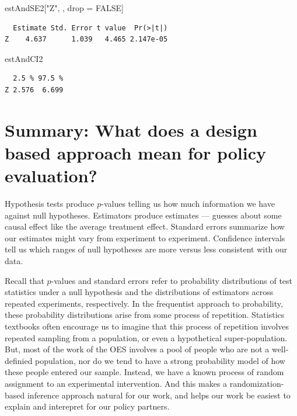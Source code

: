 \documentclass[
  12pt,
]{book}
\newenvironment{Shaded}{\begin{snugshade}}{\end{snugshade}}
\newcommand{\ConstantTok}[1]{\textcolor[rgb]{0.00,0.00,0.00}{#1}}
\newcommand{\NormalTok}[1]{#1}
\newcommand{\OtherTok}[1]{\textcolor[rgb]{0.56,0.35,0.01}{#1}}
\newcommand{\StringTok}[1]{\textcolor[rgb]{0.31,0.60,0.02}{#1}}
\theoremstyle{definition}
\theoremstyle{definition}
\theoremstyle{definition}
\theoremstyle{remark}
\begin{document}
\begin{Shaded}
\begin{Highlighting}[]
\NormalTok{estAndSE2[}\StringTok{"Z"}\NormalTok{, , drop }\OtherTok{=} \ConstantTok{FALSE}\NormalTok{]}
\end{Highlighting}
\end{Shaded}

\begin{verbatim}
  Estimate Std. Error t value  Pr(>|t|)
Z    4.637      1.039   4.465 2.147e-05
\end{verbatim}

\begin{Shaded}
\begin{Highlighting}[]
\NormalTok{estAndCI2}
\end{Highlighting}
\end{Shaded}

\begin{verbatim}
  2.5 % 97.5 %
Z 2.576  6.699
\end{verbatim}

\hypertarget{summary-what-does-a-design-based-approach-mean-for-policy-evaluation}{%
\section{Summary: What does a design based approach mean for policy
evaluation?}\label{summary-what-does-a-design-based-approach-mean-for-policy-evaluation}}

Hypothesis tests produce \(p\)-values telling us how much information we
have against null hypotheses. Estimators produce estimates --- guesses
about some causal effect like the average treatment effect. Standard
errors summarize how our estimates might vary from experiment to
experiment. Confidence intervals tell us which ranges of null hypotheses
are more versus less consistent with our data.

Recall that \(p\)-values and standard errors refer to probability
distributions of test statistics under a null hypothesis and the
distributions of estimators across repeated experiments, respectively.
In the frequentist approach to probability, these probability
distributions arise from some process of repetition. Statistics
textbooks often encourage us to imagine that this process of repetition
involves repeated sampling from a population, or even a hypothetical
super-population. But, most of the work of the OES involves a pool of
people who are not a well-definied population, nor do we tend to have a
strong probability model of how these people entered our sample.
Instead, we have a known process of random assignment to an experimental
intervention. And this makes a randomization-based inference approach
natural for our work, and helps our work be easiest to explain and
interepret for our policy partners.
\end{document}

